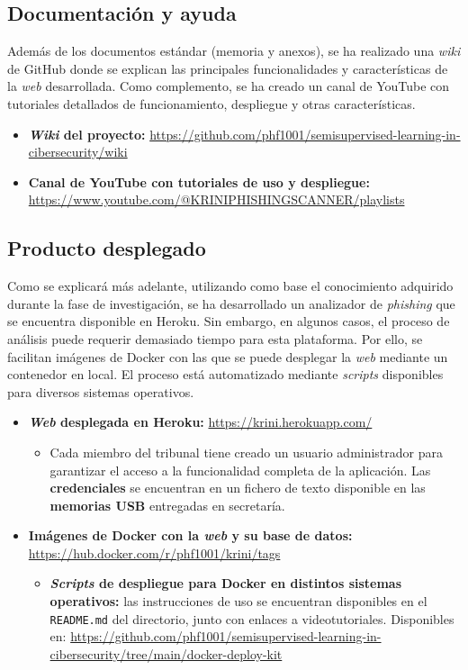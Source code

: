 \subsection{Documentación y ayuda}

Además de los documentos estándar (memoria y anexos), se ha realizado una \textit{wiki} de GitHub donde se explican las principales funcionalidades y características de la \textit{web} desarrollada. Como complemento, se ha creado un canal de YouTube con tutoriales detallados de funcionamiento, despliegue y otras características.

\begin{itemize}
	\item \textbf{\textit{Wiki} del proyecto:} 	\url{https://github.com/phf1001/semisupervised-learning-in-cibersecurity/wiki}
	\item \textbf{Canal de YouTube con tutoriales de uso y despliegue:} \url{https://www.youtube.com/@KRINIPHISHINGSCANNER/playlists}
\end{itemize}


\subsection{Producto desplegado}

Como se explicará más adelante, utilizando como base el conocimiento adquirido durante la fase de investigación, se ha desarrollado un analizador de \textit{phishing} que se encuentra disponible en Heroku. Sin embargo, en algunos casos, el proceso de análisis puede requerir demasiado tiempo para esta plataforma. Por ello, se facilitan imágenes de Docker con las que se puede desplegar la \textit{web} mediante un contenedor en local. El proceso está automatizado mediante \textit{scripts} disponibles para diversos sistemas operativos.

\begin{itemize}
	\item \textbf{\textit{Web} desplegada en Heroku:} \url{https://krini.herokuapp.com/}
	\begin{itemize}
		\item Cada miembro del tribunal tiene creado un usuario administrador para garantizar el acceso a la funcionalidad completa de la aplicación. Las \textbf{credenciales} se encuentran en un fichero de texto disponible en las \textbf{memorias USB} entregadas en secretaría.
	\end{itemize}
	\item \textbf{Imágenes de Docker con la \textit{web} y su base de datos:} \url{https://hub.docker.com/r/phf1001/krini/tags}
	\begin{itemize}
		\item \textbf{\textit{Scripts} de despliegue para Docker en distintos sistemas operativos:} las instrucciones de uso se encuentran disponibles en el \texttt{README.md} del directorio, junto con enlaces a videotutoriales. Disponibles en: \url{https://github.com/phf1001/semisupervised-learning-in-cibersecurity/tree/main/docker-deploy-kit}
	\end{itemize}

\end{itemize}
